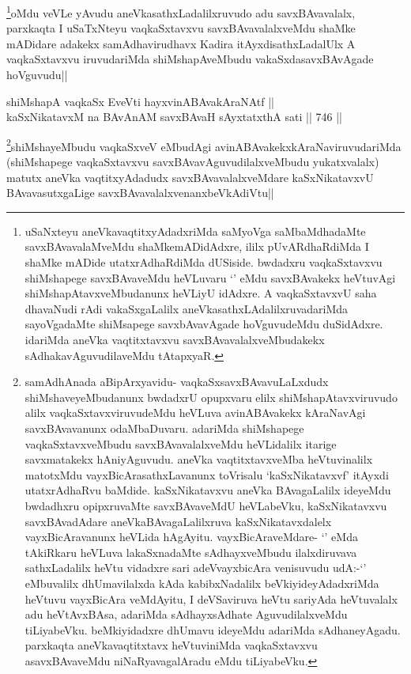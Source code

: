 \begin{artha}
\footnote{uSaNxteyu aneVkavaqtitxyAdadxriMda saMyoVga saMbaMdhadaMte savxBAvavalaMveMdu shaMkemADidAdxre, ililx pUvARdhaRdiMda I shaMke mADide utatxrAdhaRdiMda dUSiside. bwdadxru vaqkaSxtavxvu shiMshapege savxBAvaveMdu heVLuvaru `\stext' eMdu savxBAvakekx heVtuvAgi shiMshapAtavxveMbudanunx heVLiyU idAdxre. A vaqkaSxtavxvU saha dhavaNudi rAdi vakaSxgaLalilx aneVkasathxLAdalilxruvadariMda sayoVgadaMte shiMsapege savxbAvavAgade hoVguvudeMdu duSidAdxre. idariMda aneVka vaqtitxtavxvu savxBAvavalalxveMbudakekx sAdhakavAguvudilaveMdu tAtapxyaR.}oMdu veVLe yAvudu aneVkasathxLadalilxruvudo adu savxBAvavalalx, parxkaqta I uSaTxNteyu vaqkaSxtavxvu savxBAvavalalxveMdu shaMke mADidare adakekx samAdhavirudhavx Kadira itAyxdisathxLadalUlx A vaqkaSxtavxvu iruvudariMda shiMshapAveMbudu vakaSxdasavxBAvAgade hoVguvudu||
\end{artha}


\begin{shl}
shiMshapA vaqkaSx EveVti hayxvinABAvakAraNAtf ||  \\
kaSxNikatavxM na BAvAnAM savxBAvaH sAyxtatxthA  sati ||  746 || 
\end{shl}

\begin{artha}
\footnote{samAdhAnada aBipArxyavidu- vaqkaSxsavxBAvavuLaLxdudx shiMshaveyeMbudanunx bwdadxrU opupxvaru elilx shiMshapAtavxviruvudo alilx vaqkaSxtavxviruvudeMdu heVLuva avinABAvakekx kAraNavAgi savxBAvavanunx odaMbaDuvaru. adariMda shiMshapege vaqkaSxtavxveMbudu savxBAvavalalxveMdu heVLidalilx itarige savxmatakekx hAniyAguvudu. aneVka vaqtitxtavxveMba heVtuvinalilx matotxMdu vayxBicArasathxLavanunx toVrisalu `kaSxNikatavxvf' itAyxdi utatxrAdhaRvu baMdide. kaSxNikatavxvu aneVka BAvagaLalilx ideyeMdu bwdadhxru opipxruvaMte savxBAvaveMdU heVLabeVku, kaSxNikatavxvu savxBAvadAdare aneVkaBAvagaLalilxruva kaSxNikatavxdalelx vayxBicAravanunx heVLida hAgAyitu. vayxBicAraveMdare- `\stext' eMda tAkiRkaru heVLuva lakaSxnadaMte sAdhayxveMbudu ilalxdiruvava sathxLadalilx heVtu vidadxre sari adeVvayxbicAra venisuvudu udA:-`\stext' eMbuvalilx dhUmavilalxda kAda kabibxNadalilx beVkiyideyAdadxriMda heVtuvu vayxBicAra veMdAyitu, I deVSaviruva heVtu sariyAda heVtuvalalx adu heVtAvxBAsa, adariMda sAdhayxsAdhate AguvudilalxveMdu tiLiyabeVku. beMkiyidadxre dhUmavu ideyeMdu adariMda sAdhaneyAgadu. parxkaqta aneVkavaqtitxtavx heVtuviniMda vaqkaSxtavxvu asavxBAvaveMdu niNaRyavagalAradu eMdu tiLiyabeVku.}shiMshayeMbudu vaqkaSxveV eMbudAgi avinABAvakekxkAraNaviruvudariMda (shiMshapege vaqkaSxtavxvu savxBAvavAguvudilalxveMbudu yukatxvalalx) matutx aneVka vaqtitxyAdadudx savxBAvavalalxveMdare kaSxNikatavxvU BAvavasutxgaLige savxBAvavalalxvenanxbeVkAdiVtu||
\end{artha}




